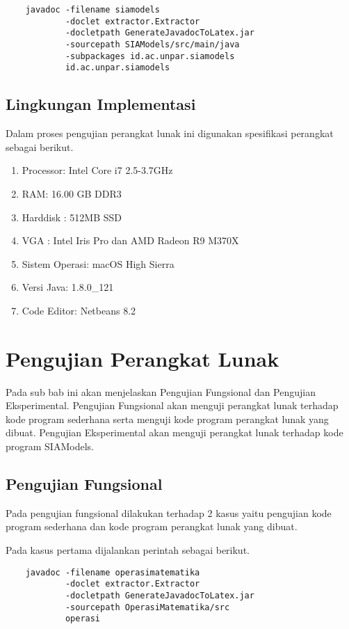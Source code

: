 \begin{verbatim}
	javadoc -filename siamodels
	        -doclet extractor.Extractor
	        -docletpath GenerateJavadocToLatex.jar
	        -sourcepath SIAModels/src/main/java
	        -subpackages id.ac.unpar.siamodels
	        id.ac.unpar.siamodels
\end{verbatim}

\subsection{Lingkungan Implementasi}
\label{sec:lingkungan perangkat lunak}
Dalam proses pengujian perangkat lunak ini digunakan spesifikasi perangkat sebagai berikut.

\begin{enumerate}
	\item Processor: Intel Core i7 2.5-3.7GHz 
	\item RAM: 16.00 GB DDR3	
	\item Harddisk : 512MB SSD
	\item VGA : Intel Iris Pro dan AMD Radeon R9 M370X
	\item Sistem Operasi: macOS High Sierra
	\item Versi Java: 1.8.0\_121
	\item Code Editor: Netbeans 8.2
\end{enumerate}

\section{Pengujian Perangkat Lunak}
\label{sec: pengujian perangkat lunak}
Pada sub bab ini akan menjelaskan Pengujian Fungsional dan Pengujian Eksperimental. Pengujian Fungsional akan menguji perangkat lunak terhadap kode program sederhana serta menguji kode program perangkat lunak yang dibuat. Pengujian Eksperimental akan menguji perangkat lunak terhadap kode program SIAModels.

\subsection{Pengujian Fungsional}
\label{sec:pengujian fungsional}
Pada pengujian fungsional dilakukan terhadap 2 kasus yaitu pengujian kode program sederhana dan kode program perangkat lunak yang dibuat.

Pada kasus pertama dijalankan perintah sebagai berikut.

\begin{verbatim}
	javadoc -filename operasimatematika
	        -doclet extractor.Extractor
	        -docletpath GenerateJavadocToLatex.jar
	        -sourcepath OperasiMatematika/src
	        operasi
\end{verbatim}

